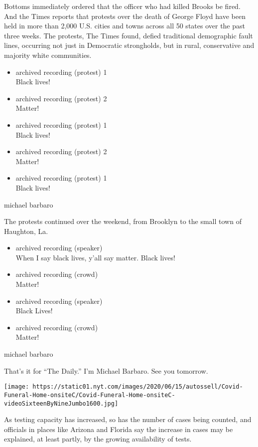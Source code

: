 Bottoms immediately ordered that the officer who had killed Brooks be
fired. And the Times reports that protests over the death of George
Floyd have been held in more than 2,000 U.S. cities and towns across all
50 states over the past three weeks. The protests, The Times found,
defied traditional demographic fault lines, occurring not just in
Democratic strongholds, but in rural, conservative and majority white
communities.

\begin{itemize}
\item
  archived recording (protest) 1\\
  Black lives!
\item
  archived recording (protest) 2\\
  Matter!
\item
  archived recording (protest) 1\\
  Black lives!
\item
  archived recording (protest) 2\\
  Matter!
\item
  archived recording (protest) 1\\
  Black lives!
\end{itemize}

michael barbaro

The protests continued over the weekend, from Brooklyn to the small town
of Haughton, La.

\begin{itemize}
\item
  archived recording (speaker)\\
  When I say black lives, y'all say matter. Black lives!
\item
  archived recording (crowd)\\
  Matter!
\item
  archived recording (speaker)\\
  Black Lives!
\item
  archived recording (crowd)\\
  Matter!
\end{itemize}

michael barbaro

That's it for ``The Daily.'' I'm Michael Barbaro. See you tomorrow.

\texttt{[image: https://static01.nyt.com/images/2020/06/15/autossell/Covid-Funeral-Home-onsiteC/Covid-Funeral-Home-onsiteC-videoSixteenByNineJumbo1600.jpg]}

As testing capacity has increased, so has the number of cases being
counted, and officials in places like Arizona and Florida say the
increase in cases may be explained, at least partly, by the growing
availability of tests.

